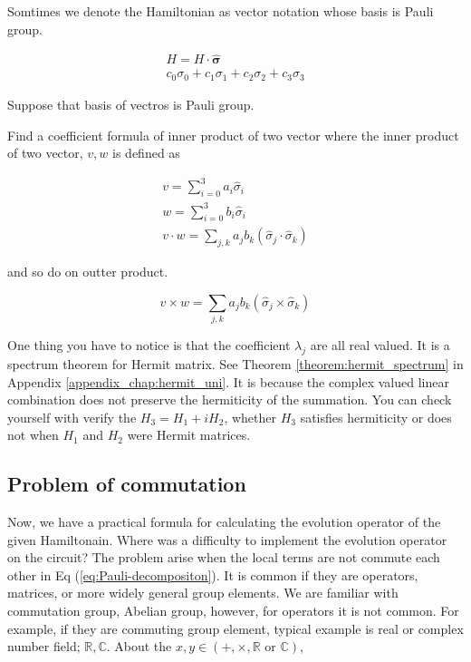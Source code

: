 Somtimes we denote the Hamiltonian as vector notation whose basis is Pauli group.

\begin{equation}
    \begin{split}
        H = H \cdot \hat{\mathbf{\sigma}} \\
        c_0 \sigma_0 +c_1 \sigma_1+c_2 \sigma_2+c_3 \sigma_3
    \end{split}
\end{equation}

\begin{exercise}
    Suppose that basis of vectros is Pauli group.

    Find a coefficient formula of inner product of two vector
    where the inner product of two vector, $v, w$ 
    is defined as
    
    \begin{equation*}
        \begin{split}
            v = \sum_{i=0}^3 a_i \hat{\sigma}_i \\
            w = \sum_{i=0}^3 b_i \hat{\sigma}_i \\
            v \cdot w = \sum_{j, k} a_j b_k (\hat{\sigma}_j \cdot \hat{\sigma}_k)
        \end{split}
    \end{equation*}

    and so do on outter product.

    \begin{equation*}
        v \times w = \sum_{j, k} a_j b_k (\hat{\sigma}_j \times \hat{\sigma}_k)
    \end{equation*}
\end{exercise}

One thing you have to notice is that the coefficient $\lambda_j$ are all real valued.
It is a spectrum theorem for Hermit matrix. See Theorem \ref{theorem:hermit_spectrum} in Appendix \ref{appendix_chap:hermit_uni}.
It is because the complex valued linear combination does not preserve the hermiticity of the 
summation. You can check yourself with verify the $H_3 = H_1 + i H_2$, whether $H_3$ satisfies hermiticity or does not
when $H_1$ and $H_2$ were Hermit matrices.

\subsection{Problem of commutation}

Now, we have a practical formula for calculating 
the evolution operator of the given Hamiltonain.
Where was a difficulty to implement the evolution operator on the circuit?
The problem arise when the local terms are not commute each other in Eq (\ref{eq:Pauli-decompositon}).
It is common if they are operators, matrices, or more widely general group elements.
We are familiar with commutation group, Abelian group, however, for operators it is not common.
For example, if they are commuting group element, typical example is real or complex number field; $\mathbb{R, C}$. 
About the $x, y \in (+, \times, \mathbb{R} \mbox{ or } \mathbb{C})$, 


